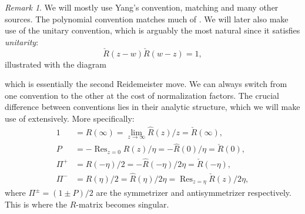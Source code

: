 \documentclass[11pt]{report}
\theoremstyle{definition}
\theoremstyle{remark}
\newtheorem*{remark}{Remark}
\theoremstyle{remark}
\begin{document}
\begin{remark}
We will mostly use Yang's convention, matching \cite{book:molev} and many other sources. The polynomial convention matches much of \cite{book:arutyunov:betheAnsatz}. We will later also make use of the unitary convention, which is arguably the most natural since it satisfies \emph{unitarity}:
\begin{equation*}
\check R(z-w) \check{R}(w-z) = 1,
\end{equation*}
illustrated with the diagram
~\\
\begin{center}
\end{center}
which is essentially the second Reidemeister move. We can always switch from one convention to the other at the cost of normalization factors. The crucial difference between conventions lies in their analytic structure, which we will make use of extensively. More specifically:
\begin{align*}
1 &= R(\infty) = \lim_{z \to \infty} \hat{R}(z)/z = \check R(\infty), \\
P &= -\operatorname{Res}_{z=0} R(z)/\eta = -\hat{R}(0)/\eta = \check R(0), \\
\Pi^+ &= R(-\eta)/2 = -\hat{R}(-\eta)/2\eta = \check R(-\eta), \\
\Pi^- &= R(\eta)/2 = \hat{R}(\eta)/2\eta = \operatorname{Res}_{z=\eta} \check R(z)/2\eta,
\end{align*}
where $\Pi^\pm = (1 \pm P)/2$ are the symmetrizer and antisymmetrizer respectively. This is where the $R$-matrix becomes singular.
\end{remark}
\end{document}
